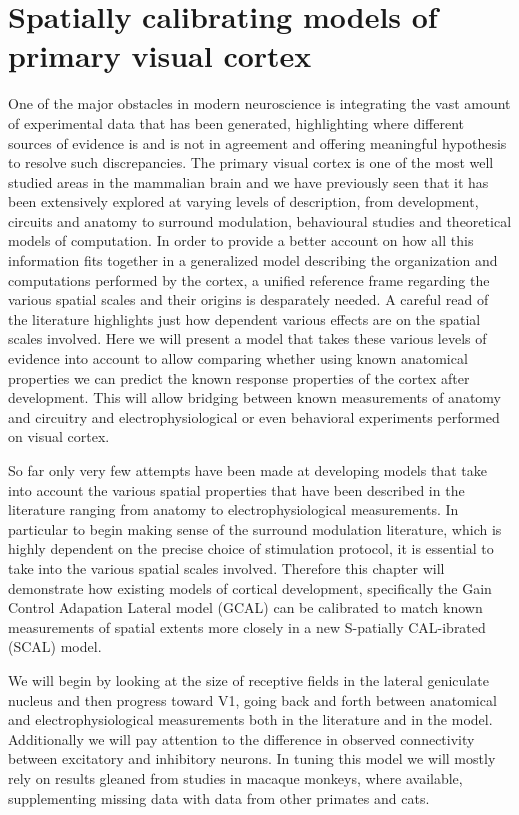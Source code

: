 \chapter{Spatially calibrating models of primary visual cortex}

One of the major obstacles in modern neuroscience is integrating the
vast amount of experimental data that has been generated, highlighting
where different sources of evidence is and is not in agreement and
offering meaningful hypothesis to resolve such discrepancies. The
primary visual cortex is one of the most well studied areas in the
mammalian brain and we have previously seen that it has been
extensively explored at varying levels of description, from
development, circuits and anatomy to surround modulation, behavioural
studies and theoretical models of computation. In order to provide a
better account on how all this information fits together in a
generalized model describing the organization and computations
performed by the cortex, a unified reference frame regarding the
various spatial scales and their origins is desparately needed. A
careful read of the literature highlights just how dependent various
effects are on the spatial scales involved. Here we will present a
model that takes these various levels of evidence into account to
allow comparing whether using known anatomical properties we can
predict the known response properties of the cortex after
development. This will allow bridging between known measurements of
anatomy and circuitry and electrophysiological or even behavioral
experiments performed on visual cortex.

So far only very few attempts have been made at developing models that
take into account the various spatial properties that have been
described in the literature ranging from anatomy to
electrophysiological measurements. In particular to begin making sense
of the surround modulation literature, which is highly dependent on
the precise choice of stimulation protocol, it is essential to take
into the various spatial scales involved. Therefore this chapter will
demonstrate how existing models of cortical development, specifically
the Gain Control Adapation Lateral model (GCAL) \citep{Stevens2013}
can be calibrated to match known measurements of spatial extents more
closely in a new S-patially CAL-ibrated (SCAL) model.

We will begin by looking at the size of receptive fields in the
lateral geniculate nucleus and then progress toward V1, going back and
forth between anatomical and electrophysiological measurements both in
the literature and in the model. Additionally we will pay attention to
the difference in observed connectivity between excitatory and
inhibitory neurons. In tuning this model we will mostly rely on
results gleaned from studies in macaque monkeys, where available,
supplementing missing data with data from other primates and cats.

